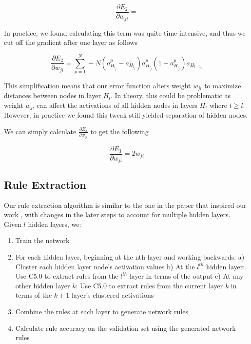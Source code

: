 \begin{equation}
  \frac{\partial E_2}{\partial w_{ji}} = 
\end{equation}

In practice, we found calculating this term was quite time intensive, and thus
we cut off the gradient after one layer as follows

\begin{equation}
  \frac{\partial E_2}{\partial w_{ji}} = \sum_{p=1}^{N} -N(a_{H_{l_j}}^p - \overline{a_{H_{l_j}}})a_{H_{l_j}}^p(1-a_{H_{l_j}}^p)a_{H_{l-1_i}}
\end{equation}

This simplification means that our error function alters weight
$w_{ji}$ to maximize distances between nodes in layer $H_{l}$. In theory, this
could be problematic as weight $w_{ji}$ can affect the activations of all
hidden nodes in layers $H_{t}$ where $t \geq l$. However, in practice we
found this tweak still yielded separation of hidden nodes.

We can simply calculate $\frac{\partial E_3}{\partial w_{ji}}$ to get the following

\begin{equation}
  \frac{\partial E_3}{\partial w_{ji}} = 2 w_{ji}
\end{equation}

\subsection{Rule Extraction}
\label{sec:re}

Our rule extraction algorithm is similar to the one in the paper that inspired our work \cite{thuan11}, with changes in the later steps to account for multiple hidden layers. Given $l$ hidden layers, we:
\begin{enumerate}
\item
Train the network
\item
For each hidden layer, beginning at the nth layer and working backwards:
\subitem
a) Cluster each hidden layer node’s activation values 
\subitem
b) At the $l^{th}$ hidden layer: Use C5.0 \cite{C5} to extract rules from
the $l^{th}$ layer in terms of the output
\subitem
c) At any other hidden layer $k$: Use C5.0 to extract rules from
the current layer $k$ in terms of the $k+1$ layer's clustered activations
\item
Combine the rules at each layer to generate network rules
\item 
Calculate rule accuracy on the validation set using the generated network rules
\end{enumerate}

